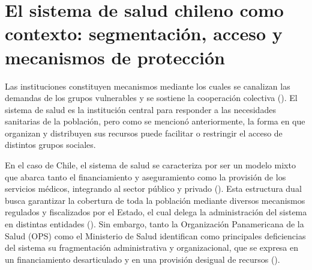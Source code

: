 \documentclass[
  spanish,
  a4paper,
  oneside]{scrbook}
\begin{document}
\section{El sistema de salud chileno como contexto: segmentación, acceso
y mecanismos de
protección}\label{el-sistema-de-salud-chileno-como-contexto-segmentaciuxf3n-acceso-y-mecanismos-de-protecciuxf3n}

Las instituciones constituyen mecanismos mediante los cuales se
canalizan las demandas de los grupos vulnerables y se sostiene la
cooperación colectiva
(). El
sistema de salud es la institución central para responder a las
necesidades sanitarias de la población, pero como se mencionó
anteriormente, la forma en que organizan y distribuyen sus recursos
puede facilitar o restringir el acceso de distintos grupos sociales.

En el caso de Chile, el sistema de salud se caracteriza por ser un
modelo mixto que abarca tanto el financiamiento y aseguramiento como la
provisión de los servicios médicos, integrando al sector público y
privado (). Esta estructura dual busca garantizar la cobertura de
toda la población mediante diversos mecanismos regulados y fiscalizados
por el Estado, el cual delega la administración del sistema en distintas
entidades (). Sin embargo, tanto la Organización Panamericana de la
Salud (OPS) como el Ministerio de Salud identifican como principales
deficiencias del sistema su fragmentación administrativa y
organizacional, que se expresa en un financiamiento desarticulado y en
una provisión desigual de recursos
().
\end{document}
